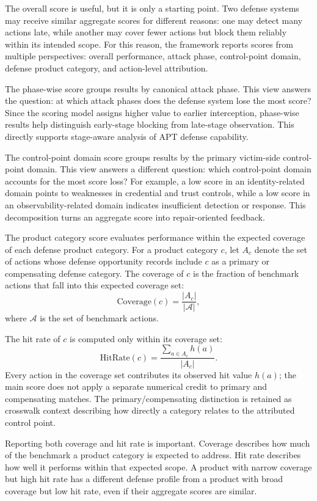 The overall score is useful, but it is only a starting point. Two defense systems may receive similar aggregate scores for different reasons: one may detect many actions late, while another may cover fewer actions but block them reliably within its intended scope. For this reason, the framework reports scores from multiple perspectives: overall performance, attack phase, control-point domain, defense product category, and action-level attribution.

The phase-wise score groups results by canonical attack phase. This view answers the question: at which attack phases does the defense system lose the most score? Since the scoring model assigns higher value to earlier interception, phase-wise results help distinguish early-stage blocking from late-stage observation. This directly supports stage-aware analysis of APT defense capability.

The control-point domain score groups results by the primary victim-side control-point domain. This view answers a different question: which control-point domain accounts for the most score loss? For example, a low score in an identity-related domain points to weaknesses in credential and trust controls, while a low score in an observability-related domain indicates insufficient detection or response. This decomposition turns an aggregate score into repair-oriented feedback.

The product category score evaluates performance within the expected coverage of each defense product category. For a product category $c$, let $A_c$ denote the set of actions whose defense opportunity records include $c$ as a primary or compensating defense category. The coverage of $c$ is the fraction of benchmark actions that fall into this expected coverage set:
\[
\mathrm{Coverage}(c) =
\frac{|A_c|}{|\mathcal{A}|},
\]
where $\mathcal{A}$ is the set of benchmark actions.

The hit rate of $c$ is computed only within its coverage set:
\[
\mathrm{HitRate}(c) =
\frac{\sum_{a \in A_c} h(a)}
     {|A_c|}.
\]
Every action in the coverage set contributes its observed hit value $h(a)$; the main score does not apply a separate numerical credit to primary and compensating matches. The primary/compensating distinction is retained as crosswalk context describing how directly a category relates to the attributed control point.

Reporting both coverage and hit rate is important. Coverage describes how much of the benchmark a product category is expected to address. Hit rate describes how well it performs within that expected scope. A product with narrow coverage but high hit rate has a different defense profile from a product with broad coverage but low hit rate, even if their aggregate scores are similar.

